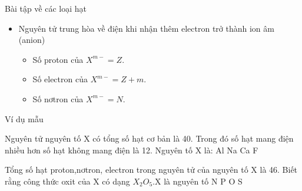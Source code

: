 \begin{dangntd}{Bài tập về các loại hạt}
\begin{itemize}
		\item Nguyên tử trung hòa về điện khi nhận thêm electron trở thành ion âm (anion)
		\begin{center}
		\end{center}
		\begin{itemize}
			\item Số proton của $ X^{m-} = Z $.
			\item Số electron của $ X^{m-} = Z+m $.
			\item Số nơtron của $ X^{m-} = N $.
		\end{itemize}
	\end{itemize}
\end{dangntd}
\begin{vdm}{Ví dụ mẫu}
\end{vdm}

\begin{vdex}[2]
	Nguyên tử nguyên tố X có tổng số hạt cơ bản là 40. Trong đó số hạt mang điện nhiều hơn số hạt không mang điện là 12. Nguyên tố X là:
	\choice
	{%
\True	Al
}
	{%
	Na
}
	{%
	Ca
}
	{%
	F
}

\end{vdex}

\begin{vdex}[2]
	Tổng số hạt proton,nơtron, electron trong nguyên tử của nguyên tố X là 46. Biết rằng công thức oxit của X có dạng $ X_{2}O_{5} $.X là nguyên tố
	\choice
{%
	N
}
{%
\True	P
}
{%
	O
}
{%
	S
}
\huongdan{
}
\end{vdex}


